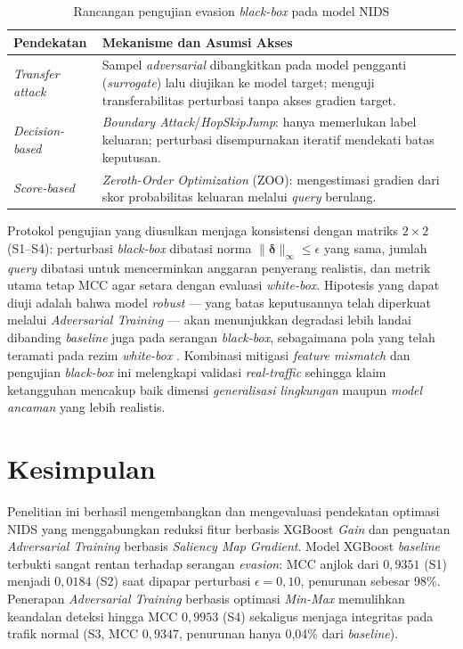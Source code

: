 \documentclass[10pt,twocolumn,a4paper]{extarticle}
\begin{document}
\begin{table}[htbp]
\caption{Rancangan pengujian evasion \textit{black-box} pada model NIDS}
\label{tab:blackbox}
\centering
\footnotesize
\begin{tabularx}{\linewidth}{@{} l X @{}}
\toprule
\textbf{Pendekatan} & \textbf{Mekanisme dan Asumsi Akses} \\ \midrule
\textit{Transfer attack} & Sampel \textit{adversarial} dibangkitkan pada model pengganti (\textit{surrogate}) lalu diujikan ke model target; menguji transferabilitas perturbasi tanpa akses gradien target. \\ \addlinespace
\textit{Decision-based} & \textit{Boundary Attack}/\textit{HopSkipJump}: hanya memerlukan label keluaran; perturbasi disempurnakan iteratif mendekati batas keputusan. \\ \addlinespace
\textit{Score-based} & \textit{Zeroth-Order Optimization} (ZOO): mengestimasi gradien dari skor probabilitas keluaran melalui \textit{query} berulang. \\ \bottomrule
\end{tabularx}
\end{table}

Protokol pengujian yang diusulkan menjaga konsistensi dengan matriks $2\times2$ (S1--S4): perturbasi \textit{black-box} dibatasi norma $\|\boldsymbol{\delta}\|_\infty \le \epsilon$ yang sama, jumlah \textit{query} dibatasi untuk mencerminkan anggaran penyerang realistis, dan metrik utama tetap MCC agar setara dengan evaluasi \textit{white-box}. Hipotesis yang dapat diuji adalah bahwa model \textit{robust} --- yang batas keputusannya telah diperkuat melalui \textit{Adversarial Training} --- akan menunjukkan degradasi lebih landai dibanding \textit{baseline} juga pada serangan \textit{black-box}, sebagaimana pola yang telah teramati pada rezim \textit{white-box} \citep{ref_madry}. Kombinasi mitigasi \textit{feature mismatch} dan pengujian \textit{black-box} ini melengkapi validasi \textit{real-traffic} sehingga klaim ketangguhan mencakup baik dimensi \textit{generalisasi lingkungan} maupun \textit{model ancaman} yang lebih realistis.

\section{Kesimpulan}
Penelitian ini berhasil mengembangkan dan mengevaluasi pendekatan optimasi NIDS yang menggabungkan reduksi fitur berbasis XGBoost \textit{Gain} dan penguatan \textit{Adversarial Training} berbasis \textit{Saliency Map Gradient}. Model XGBoost \textit{baseline} terbukti sangat rentan terhadap serangan \textit{evasion}: MCC anjlok dari $0{,}9351$ (S1) menjadi $0{,}0184$ (S2) saat dipapar perturbasi $\epsilon = 0{,}10$, penurunan sebesar 98\%. Penerapan \textit{Adversarial Training} berbasis optimasi \textit{Min-Max} memulihkan keandalan deteksi hingga MCC $0{,}9953$ (S4) sekaligus menjaga integritas pada trafik normal (S3, MCC $0{,}9347$, penurunan hanya 0,04\% dari \textit{baseline}).
\end{document}
